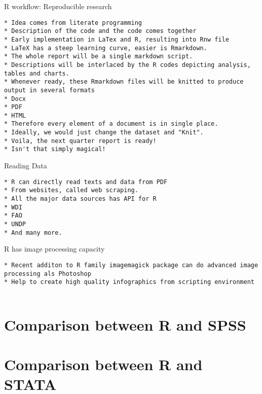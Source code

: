 \begin{frame}[fragile]{R workflow: Reproducible research}

\begin{verbatim}
* Idea comes from literate programming
* Description of the code and the code comes together
* Early implementation in LaTex and R, resulting into Rnw file
* LaTeX has a steep learning curve, easier is Rmarkdown. 
* The whole report will be a single markdown script. 
* Descriptions will be interlaced by the R codes depicting analysis, tables and charts. 
* Whenever ready, these Rmarkdown files will be knitted to produce output in several formats
* Docx
* PDF
* HTML
* Therefore every element of a document is in single place. 
* Ideally, we would just change the dataset and "Knit". 
* Voila, the next quarter report is ready!
* Isn't that simply magical!
\end{verbatim}

\end{frame}

\begin{frame}[fragile]{Reading Data}

\begin{verbatim}
* R can directly read texts and data from PDF
* From websites, called web scraping. 
* All the major data sources has API for R
* WDI
* FAO
* UNDP
* And many more. 
\end{verbatim}

\end{frame}

\begin{frame}[fragile]{R has image processing capacity}

\begin{verbatim}
* Recent additon to R family imagemagick package can do advanced image processing als Photoshop
* Help to create high quality infographics from scripting environment
  
\end{verbatim}

\end{frame}

\section{Comparison between R and
SPSS}\label{comparison-between-r-and-spss}

\section{Comparison between R and
STATA}\label{comparison-between-r-and-stata}

